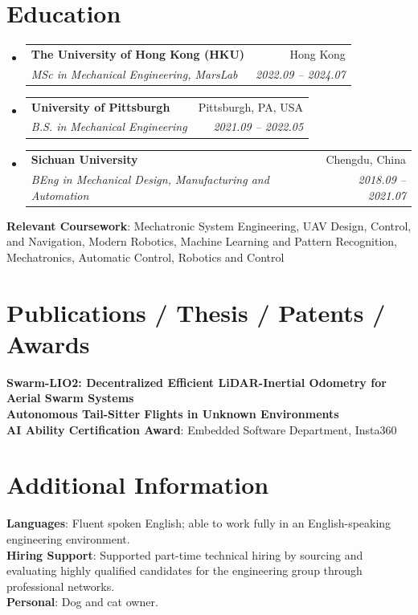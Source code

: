 \documentclass[letterpaper,11pt]{article}
\makeatletter
\newcommand{\resumeSubheading}[4]{
  \vspace{-2pt}\item
    \begin{tabular*}{0.97\textwidth}[t]{l@{\extracolsep{\fill}}r}
      \textbf{#1} & #2 \\
      \textit{\small#3} & \textit{\small #4} \\
    \end{tabular*}\vspace{-7pt}
}
\newcommand{\resumeSubHeadingListStart}{\begin{itemize}[leftmargin=0.15in, label={}]}
\newcommand{\resumeSubHeadingListEnd}{\end{itemize}}
\makeatother
\begin{document}
\section{Education}
  \resumeSubHeadingListStart
    \resumeSubheading
      {The University of Hong Kong (HKU)}{Hong Kong}
      {MSc in Mechanical Engineering, MarsLab}{2022.09 -- 2024.07}
    \resumeSubheading
      {University of Pittsburgh}{Pittsburgh, PA, USA}
      {B.S. in Mechanical Engineering}{2021.09 -- 2022.05}
    \resumeSubheading
      {Sichuan University}{Chengdu, China}
      {BEng in Mechanical Design, Manufacturing and Automation}{2018.09 -- 2021.07}
  \resumeSubHeadingListEnd
  \begin{itemize}[leftmargin=0.15in, label={}]
    \small{\item{
      \textbf{Relevant Coursework}{: Mechatronic System Engineering, UAV Design, Control, and Navigation, Modern Robotics, Machine Learning and Pattern Recognition, Mechatronics, Automatic Control, Robotics and Control}
    }}
  \end{itemize}

\section{Publications / Thesis / Patents / Awards}
  \begin{itemize}[leftmargin=0.15in, label={}]
    \small{\item{
      \textbf{Swarm-LIO2: Decentralized Efficient LiDAR-Inertial Odometry for Aerial Swarm Systems} \\
      \textbf{Autonomous Tail-Sitter Flights in Unknown Environments} \\
      \textbf{AI Ability Certification Award}{: Embedded Software Department, Insta360}
    }}
 \end{itemize}

\section{Additional Information}
  \begin{itemize}[leftmargin=0.15in, label={}]
    \small{\item{
      \textbf{Languages}{: Fluent spoken English; able to work fully in an English-speaking engineering environment.} \\
      \textbf{Hiring Support}{: Supported part-time technical hiring by sourcing and evaluating highly qualified candidates for the engineering group through professional networks.} \\
      \textbf{Personal}{: Dog and cat owner.}
    }}
 \end{itemize}

\end{document}
